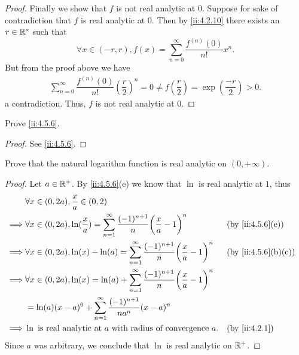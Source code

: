\begin{proof}
  Finally we show that \(f\) is not real analytic at \(0\).
  Suppose for sake of contradiction that \(f\) is real analytic at \(0\).
  Then by \cref{ii:4.2.10} there exists an \(r \in \mathbb{R}^*\) such that
  \[
    \forall x \in (-r, r), f(x) = \sum_{n = 0}^\infty \dfrac{f^{(n)}(0)}{n!} x^n.
  \]
  But from the proof above we have
  \begin{align*}
    \sum_{n = 0}^\infty \dfrac{f^{(n)}(0)}{n!} (\dfrac{r}{2})^n = 0 \neq f(\dfrac{r}{2}) = \exp(\dfrac{-r}{2}) > 0.
  \end{align*}
  a contradiction.
  Thus, \(f\) is not real analytic at \(0\).
\end{proof}

\begin{ex}\label{ii:ex:4.5.5}
  Prove \cref{ii:4.5.6}.
\end{ex}

\begin{proof}
  See \cref{ii:4.5.6}.
\end{proof}

\begin{ex}\label{ii:ex:4.5.6}
  Prove that the natural logarithm function is real analytic on \((0, +\infty)\).
\end{ex}

\begin{proof}
  Let \(a \in \mathbb{R}^+\).
  By \cref{ii:4.5.6}(e) we know that \(\ln\) is real analytic at \(1\), thus
  \begin{align*}
             & \forall x \in (0, 2a), \dfrac{x}{a} \in (0, 2)                                                                                                \\
    \implies & \forall x \in (0, 2a), \ln(\dfrac{x}{a}) = \sum_{n = 1}^\infty \dfrac{(-1)^{n + 1}}{n} \bigg(\dfrac{x}{a} - 1\bigg)^n &  & \by{ii:4.5.6}[e]   \\
    \implies & \forall x \in (0, 2a), \ln(x) - \ln(a) = \sum_{n = 1}^\infty \dfrac{(-1)^{n + 1}}{n} \bigg(\dfrac{x}{a} - 1\bigg)^n   &  & \by{ii:4.5.6}[b,c] \\
    \implies & \forall x \in (0, 2a), \ln(x) = \ln(a) + \sum_{n = 1}^\infty \dfrac{(-1)^{n + 1}}{n} \bigg(\dfrac{x}{a} - 1\bigg)^n                           \\
             & = \ln(a) (x - a)^0 + \sum_{n = 1}^\infty \dfrac{(-1)^{n + 1}}{n a^n} (x - a)^n                                                                \\
    \implies & \ln \text{ is real analytic at } a \text{ with radius of convergence } a.                                             &  & \by{ii:4.2.1}
  \end{align*}
  Since \(a\) was arbitrary, we conclude that \(\ln\) is real analytic on \(\mathbb{R}^+\).
\end{proof}


